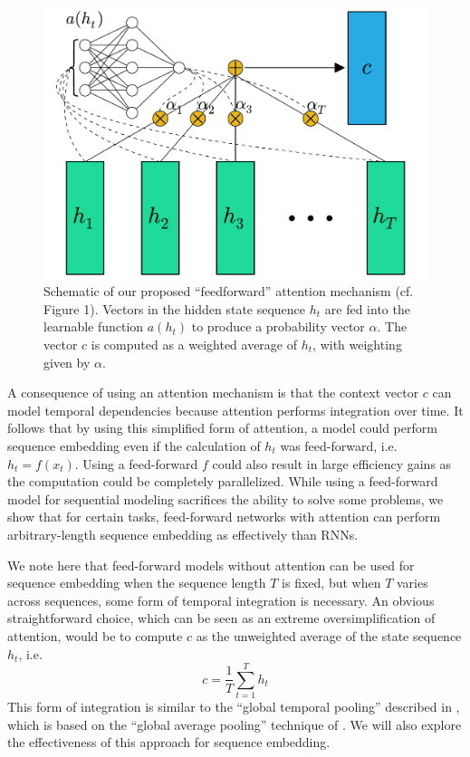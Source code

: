 \documentclass{article} %
\begin{document}
\begin{figure}
  \centering
  \includegraphics[width=.8\textwidth]{schematic.pdf}
  \caption{Schematic of our proposed ``feedforward'' attention mechanism (cf.\ \cite{cho2015introduction} Figure 1).  Vectors in the hidden state sequence $h_t$ are fed into the learnable function $a(h_t)$ to produce a probability vector $\alpha$.  The vector $c$ is computed as a weighted average of $h_t$, with weighting given by $\alpha$.}
  \label{fig:schematic}
\end{figure}


A consequence of using an attention mechanism is that the context vector $c$ can model temporal dependencies because attention performs integration over time.
It follows that by using this simplified form of attention, a model could perform sequence embedding even if the calculation of $h_t$ was feed-forward, i.e.\ $h_t = f(x_t)$.
Using a feed-forward $f$ could also result in large efficiency gains as the computation could be completely parallelized.
While using a feed-forward model for sequential modeling sacrifices the ability to solve some problems, we show that for certain tasks, feed-forward networks with attention can perform arbitrary-length sequence embedding as effectively than RNNs.

We note here that feed-forward models without attention can be used for sequence embedding when the sequence length $T$ is fixed, but when $T$ varies across sequences, some form of temporal integration is necessary.
An obvious straightforward choice, which can be seen as an extreme oversimplification of attention, would be to compute $c$ as the unweighted average of the state sequence $h_t$, i.e.
\begin{equation}
\label{eq:unweighted}
c = \frac{1}{T}\sum_{t = 1}^T h_t
\end{equation}
This form of integration is similar to the ``global temporal pooling'' described in \cite{dieleman2014recommending}, which is based on the ``global average pooling'' technique of \cite{lin2014network}.
We will also explore the effectiveness of this approach for sequence embedding.
\end{document}
